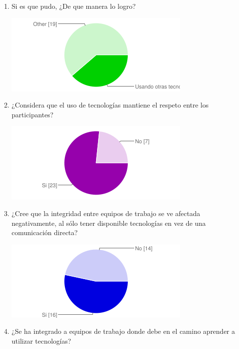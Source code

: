 \begin{enumerate}
\begin{enumerate}
\begin{center}
    \end{center}
        \item Si es que pudo, ¿De que manera lo logro?\\
    \begin{center}
	\includegraphics[scale=0.7]{images/fig11}
    \end{center}
        \item ¿Considera que el uso de tecnologías mantiene el respeto entre los participantes?\\
    \begin{center}
	\includegraphics[scale=0.7]{images/fig12}
    \end{center}
        \item ¿Cree que la integridad entre equipos de trabajo se ve afectada negativamente, al sólo tener disponible tecnologías en vez de una comunicación directa?\\
    \begin{center}
	\includegraphics[scale=0.7]{images/fig13}
    \end{center}
        \item ¿Se ha integrado a equipos de trabajo donde debe en el camino aprender a utilizar tecnologías?\\
    \begin{center}

\end{center}
\end{enumerate}
\end{enumerate}
